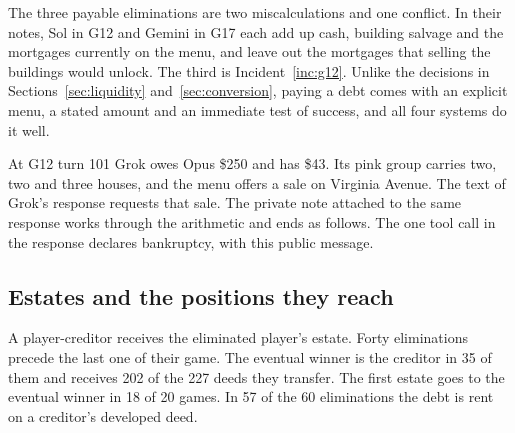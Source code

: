 The three payable eliminations are two miscalculations and one conflict. In their notes, Sol in G12 and Gemini in G17 each add up cash, building salvage and the mortgages currently on the menu, and leave out the mortgages that selling the buildings would unlock. The third is Incident~\ref{inc:g12}. Unlike the decisions in Sections~\ref{sec:liquidity} and~\ref{sec:conversion}, paying a debt comes with an explicit menu, a stated amount and an immediate test of success, and all four systems do it well.


At G12 turn 101 Grok owes Opus \$250 and has \$43. Its pink group carries two, two and three houses, and the menu offers a sale on Virginia Avenue. The text of Grok's response requests that sale.
The private note attached to the same response works through the arithmetic and ends as follows.
The one tool call in the response declares bankruptcy, with this public message.

\subsection{Estates and the positions they reach}

A player-creditor receives the eliminated player's estate. Forty eliminations precede the last one of their game. The eventual winner is the creditor in 35 of them and receives 202 of the 227 deeds they transfer. The first estate goes to the eventual winner in 18 of 20 games. In 57 of the 60 eliminations the debt is rent on a creditor's developed deed.

